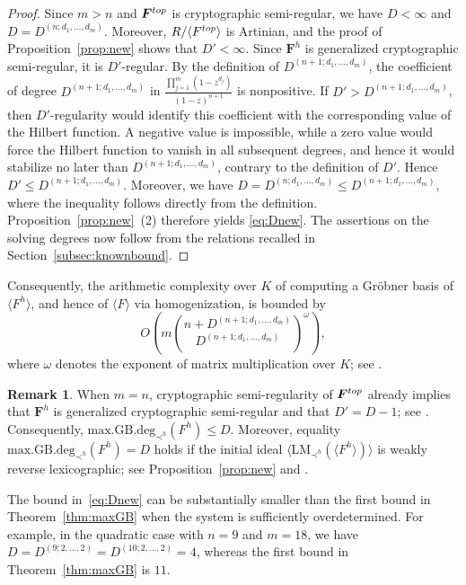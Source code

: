 \documentclass{article}
\theoremstyle{definition}
\newtheorem{remark}[theorem]{Remark}
\theoremstyle{plain}
\theoremstyle{plain}
\theoremstyle{plain}
\theoremstyle{plain}
\numberwithin{equation}{subsection}
\begin{document}
\begin{proof}
Since $m>n$ and $\bm F^{\rm top}$ is cryptographic semi-regular, we have $D<\infty$ and $D=D^{(n;d_1,\ldots,d_m)}$.
Moreover, $R/\langle F^{\rm top}\rangle$ is Artinian, and the proof of Proposition~\ref{prop:new} shows that $D'<\infty$.
Since $\bm F^h$ is generalized cryptographic semi-regular, it is $D'$-regular.
By the definition of $D^{(n+1;d_1,\ldots,d_m)}$, the coefficient of degree $D^{(n+1;d_1,\ldots,d_m)}$ in $\frac{\prod_{j=1}^m(1-z^{d_j})}{(1-z)^{n+1}}$ is nonpositive.
If $D'>D^{(n+1;d_1,\ldots,d_m)}$, then $D'$-regularity would identify this coefficient with the corresponding value of the Hilbert function.
A negative value is impossible, while a zero value would force the Hilbert function to vanish in all subsequent degrees, and hence it would stabilize no later than $D^{(n+1;d_1,\ldots,d_m)}$, contrary to the definition of $D'$.
Hence $D'\leq D^{(n+1;d_1,\ldots,d_m)}$.
Moreover, we have $D=D^{(n;d_1,\ldots,d_m)}\le D^{(n+1;d_1,\ldots,d_m)}$, where the inequality follows directly from the definition.
Proposition~\ref{prop:new}~{\rm (2)} therefore yields \eqref{eq:Dnew}.
The assertions on the solving degrees now follow from the relations recalled in Section~\ref{subsec:knownbound}.
\end{proof}

Consequently, the arithmetic complexity over $K$ of computing a Gr\"obner basis of $\langle F^h\rangle$, and hence of $\langle F\rangle$ via homogenization, is bounded by
\begin{equation}\label{eq:new_comp_bound}
O\left(
m
\binom{
n+D^{(n+1;d_1,\ldots,d_m)}
}{
D^{(n+1;d_1,\ldots,d_m)}
}^{\omega}
\right),
\end{equation}
where $\omega$ denotes the exponent of matrix multiplication over $K$; see \cite[Theorem~1.1~(2) and Remark~3]{KY2}.

\begin{remark}\label{rem:mn}
When $m=n$, cryptographic semi-regularity of $\bm F^{\rm top}$ already implies that $\bm F^h$ is generalized cryptographic semi-regular and that $D'=D-1$; see \cite[Lemma~3.1.1]{KY2}.
Consequently, $\mathrm{max.GB.deg}_{\prec^h}(F^h)\leq D$.
Moreover, equality $\mathrm{max.GB.deg}_{\prec^h}(F^h)=D$ holds if the initial ideal $\langle\mathrm{LM}_{\prec^h}(\langle F^h\rangle)\rangle$ is weakly reverse lexicographic;
see Proposition~\ref{prop:new} and \cite[Theorem~1.2]{KY2}.
\end{remark}

The bound in~\eqref{eq:Dnew} can be substantially smaller than the first bound in Theorem~\ref{thm:maxGB} when the system is sufficiently overdetermined.
For example, in the quadratic case with $n=9$ and $m=18$, we have $D=D^{(9;2,\ldots,2)}=D^{(10;2,\ldots,2)}=4$, whereas the first bound in Theorem~\ref{thm:maxGB} is $11$.
\end{document}
